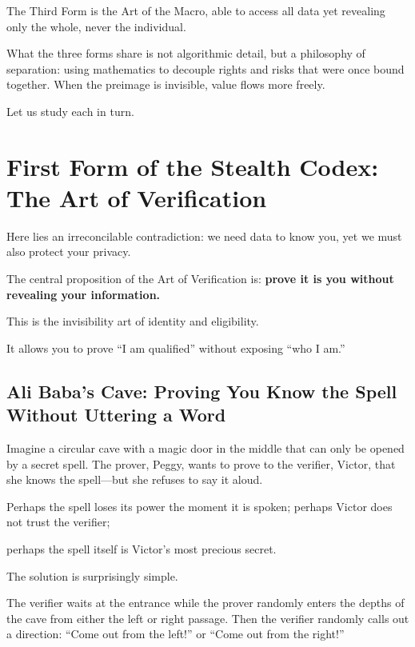 The Third Form is the Art of the Macro, able to access all data yet revealing only the whole, never the individual.

\vspace{1em}

What the three forms share is not algorithmic detail, but a philosophy of separation:
using mathematics to decouple rights and risks that were once bound together.
When the preimage is invisible, value flows more freely.

\vspace{1em}

Let us study each in turn.

\section{First Form of the Stealth Codex: The Art of Verification}

Here lies an irreconcilable contradiction: we need data to know you, yet we must also protect your privacy.

The central proposition of the Art of Verification is: \textbf{prove it is you without revealing your information.}

This is the invisibility art of identity and eligibility.

It allows you to prove ``I am qualified'' without exposing ``who I am.''

\newpage
\subsection{Ali Baba's Cave: Proving You Know the Spell Without Uttering a Word}

Imagine a circular cave with a magic door in the middle that can only be opened by a secret spell.
The prover, Peggy, wants to prove to the verifier, Victor, that she knows the spell---but she refuses to say it aloud.

Perhaps the spell loses its power the moment it is spoken; perhaps Victor does not trust the verifier;

perhaps the spell itself is Victor's most precious secret.

\vspace{1em}
The solution is surprisingly simple.

The verifier waits at the entrance while the prover randomly enters the depths of the cave from either the left or right passage. Then the verifier randomly calls out a direction: ``Come out from the left!'' or ``Come out from the right!''

